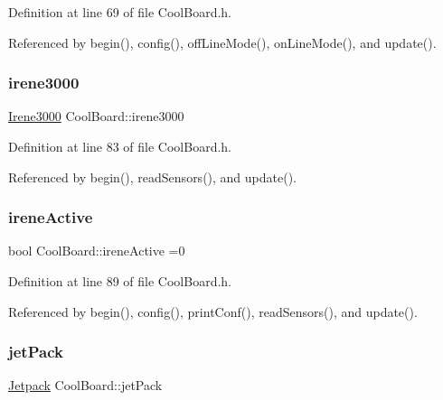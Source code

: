 Definition at line 69 of file Cool\+Board.\+h.



Referenced by begin(), config(), off\+Line\+Mode(), on\+Line\+Mode(), and update().

\mbox{\label{classCoolBoard_ad103718ce316006c4695b8eb312eaf11}} 
\subsubsection{\texorpdfstring{irene3000}{irene3000}}
{\footnotesize\ttfamily \hyperlink{classIrene3000}{Irene3000} Cool\+Board\+::irene3000\hspace{0.3cm}{\ttfamily [private]}}



Definition at line 83 of file Cool\+Board.\+h.



Referenced by begin(), read\+Sensors(), and update().

\mbox{\label{classCoolBoard_a9c3f7ac625481ee2ae802a25d97a4ae0}} 
\subsubsection{\texorpdfstring{irene\+Active}{ireneActive}}
{\footnotesize\ttfamily bool Cool\+Board\+::irene\+Active =0\hspace{0.3cm}{\ttfamily [private]}}



Definition at line 89 of file Cool\+Board.\+h.



Referenced by begin(), config(), print\+Conf(), read\+Sensors(), and update().

\mbox{\label{classCoolBoard_a30b1357881b01ccbec676856a91e48e9}} 
\subsubsection{\texorpdfstring{jet\+Pack}{jetPack}}
{\footnotesize\ttfamily \hyperlink{classJetpack}{Jetpack} Cool\+Board\+::jet\+Pack\hspace{0.3cm}{\ttfamily [private]}}



